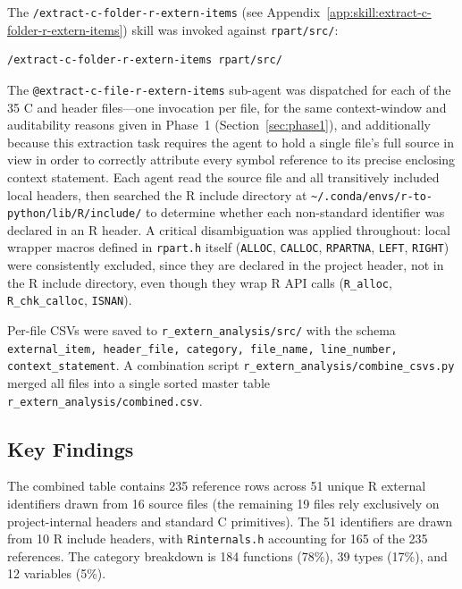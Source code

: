 \documentclass[12pt]{article}
\newcommand{\skillapp}[2]{\texttt{/#1} (see Appendix~\ref{app:skill:#2})}
\begin{document}
The \skillapp{extract-c-folder-r-extern-items}{extract-c-folder-r-extern-items} skill was invoked against \texttt{rpart/src/}:
\begin{lstlisting}[style=skill]
/extract-c-folder-r-extern-items rpart/src/
\end{lstlisting}

The \texttt{@extract-c-file-r-extern-items} sub-agent was dispatched for each of the 35 C and header files---one invocation per file, for the same context-window and auditability reasons given in Phase~1 (Section~\ref{sec:phase1}), and additionally because this extraction task requires the agent to hold a single file's full source in view in order to correctly attribute every symbol reference to its precise enclosing context statement. Each agent read the source file and all transitively included local headers, then searched the R include directory at \texttt{\textasciitilde/.conda/envs/r-to-python/lib/R/include/} to determine whether each non-standard identifier was declared in an R header. A critical disambiguation was applied throughout: local wrapper macros defined in \texttt{rpart.h} itself (\texttt{ALLOC}, \texttt{CALLOC}, \texttt{RPARTNA}, \texttt{LEFT}, \texttt{RIGHT}) were consistently excluded, since they are declared in the project header, not in the R include directory, even though they wrap R API calls (\texttt{R\_alloc}, \texttt{R\_chk\_calloc}, \texttt{ISNAN}).

Per-file CSVs were saved to \texttt{r\_extern\_analysis/src/} with the schema \texttt{external\_item, header\_file, category, file\_name, line\_number, context\_statement}. A combination script \texttt{r\_extern\_analysis/combine\_csvs.py} merged all files into a single sorted master table \texttt{r\_extern\_analysis/combined.csv}.

\subsection{Key Findings}

The combined table contains 235 reference rows across 51 unique R external identifiers drawn from 16 source files (the remaining 19 files rely exclusively on project-internal headers and standard C primitives). The 51 identifiers are drawn from 10 R include headers, with \texttt{Rinternals.h} accounting for 165 of the 235 references. The category breakdown is 184 functions (78\%), 39 types (17\%), and 12 variables (5\%).
\end{document}
